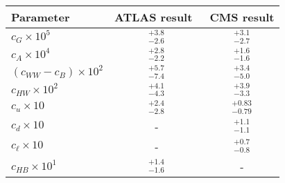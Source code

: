 \begin{tabular}{lcc}
\hline
  Parameter & ATLAS result~\cite{ATL-PHYS-PUB-2017-018} & CMS result \\ \hline
  $c_G \times 10^5$ & {}$^{+3.8}_{-2.6}$  & {}$^{+3.1}_{-2.7}$ \\ 
  
  $c_A \times 10^4$ & {}$^{+2.8}_{-2.2}$  & {}$^{+1.6}_{-1.6}$ \\
  
  $(c_{WW}-c_B) \times 10^2$ & {}$^{+5.7}_{-7.4}$  & {}$^{+3.4}_{-5.0}$ \\
  
  $c_{HW} \times 10^2$ & {}$^{+4.1}_{-4.3}$  & {}$^{+3.9}_{-3.3}$ \\

  $c_u \times 10$ & {}$^{+2.4}_{-2.8}$  & {}$^{+0.83}_{-0.79}$ \\ \hline
  
  $c_d \times 10$ & -  & {}$^{+1.1}_{-1.1}$ \\
  
  $c_\ell \times 10$ & -  & {}$^{+0.7}_{-0.8}$ \\ \hline
  
  $c_{HB} \times 10^1$ & {}$^{+1.4}_{-1.6}$  & - \\
  \hline

\end{tabular}